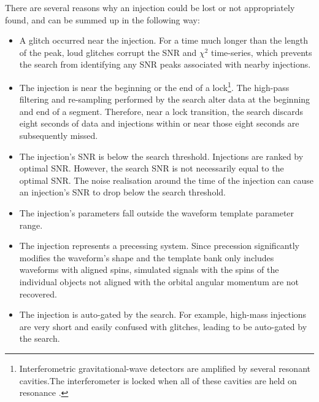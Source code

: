 \documentclass[binding=0.6cm, LaM]{sapthesis}
\begin{document}
	There are several reasons why an injection could be lost or not appropriately found,
    	and can be summed up in the following way:
       	\begin{itemize}
                \item A glitch occurred near the injection. For a time much longer than the length of the peak, 
		      loud glitches corrupt the SNR and $\chi^2$ time-series, which prevents the search from identifying any SNR peaks associated with nearby injections.
                \item The injection is near the beginning or the end of a lock\footnote{Interferometric gravitational-wave detectors are amplified by several resonant cavities.The interferometer is locked when all of these cavities are held on resonance \cite{}.}. The high-pass filtering and re-sampling performed by the search alter data at the beginning and end of a segment. Therefore, near a lock transition, the search discards eight seconds of data and injections within or near those eight seconds are subsequently missed.
                \item The injection’s SNR is below the search threshold. Injections are ranked by optimal SNR. However, the search SNR is not necessarily equal to the optimal SNR. The noise realisation around the time of the injection can cause an injection’s SNR to drop below the search threshold.
                \item The injection’s parameters fall outside the waveform template parameter range.
                \item The injection represents a precessing system.  Since precession significantly modifies the waveform’s shape and the template bank only includes waveforms with aligned spins, simulated signals with the spins of the individual objects not aligned with the orbital angular momentum are not recovered.
                \item The injection is auto-gated by the search. For example, high-mass injections are very short and easily confused with glitches, leading to be auto-gated by the search. 
        \end{itemize}
    	
\end{document}
